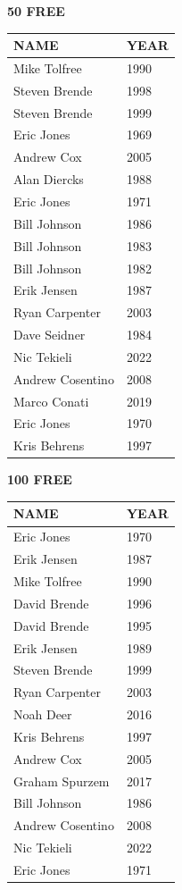 \begin{table}[H]
\centering
\begin{minipage}[t]{0.48\textwidth}
\centering
\textbf{50 FREE}\\[0.1cm]
\begin{tabular}{@{}p{2.8cm}p{1.2cm}@{}}
\hline
    \textbf{NAME} & \textbf{YEAR} \\
\hline
    Mike Tolfree & 1990 \\
    Steven Brende & 1998 \\
    Steven Brende & 1999 \\
    Eric Jones & 1969 \\
    Andrew Cox & 2005 \\
    Alan Diercks & 1988 \\
    Eric Jones & 1971 \\
    Bill Johnson & 1986 \\
    Bill Johnson & 1983 \\
    Bill Johnson & 1982 \\
    Erik Jensen & 1987 \\
    Ryan Carpenter & 2003 \\
    Dave Seidner & 1984 \\
    Nic Tekieli & 2022 \\
    Andrew Cosentino & 2008 \\
    Marco Conati & 2019 \\
    Eric Jones & 1970 \\
    Kris Behrens & 1997 \\
\hline
\end{tabular}
\end{minipage}\hfill
\begin{minipage}[t]{0.48\textwidth}
\centering
\textbf{100 FREE}\\[0.1cm]
\begin{tabular}{@{}p{2.8cm}p{1.2cm}@{}}
\hline
    \textbf{NAME} & \textbf{YEAR} \\
\hline
    Eric Jones & 1970 \\
    Erik Jensen & 1987 \\
    Mike Tolfree & 1990 \\
    David Brende & 1996 \\
    David Brende & 1995 \\
    Erik Jensen & 1989 \\
    Steven Brende & 1999 \\
    Ryan Carpenter & 2003 \\
    Noah Deer & 2016 \\
    Kris Behrens & 1997 \\
    Andrew Cox & 2005 \\
    Graham Spurzem & 2017 \\
    Bill Johnson & 1986 \\
    Andrew Cosentino & 2008 \\
    Nic Tekieli & 2022 \\
    Eric Jones & 1971 \\
\hline
\end{tabular}
\end{minipage}
\end{table}

